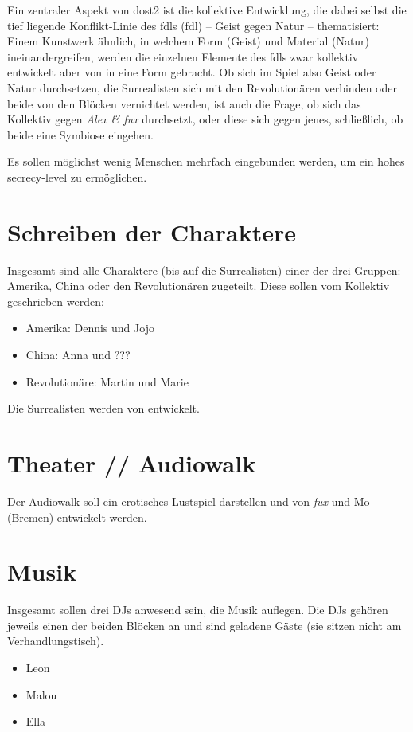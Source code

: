 Ein zentraler Aspekt von \ac{dost2} ist die kollektive Entwicklung, die dabei
selbst die tief liegende Konflikt-Linie des \aclp{fdl} (\acs{fdl}) 
-- Geist gegen Natur -- thematisiert: Einem Kunstwerk ähnlich, in welchem Form
(Geist) und Material (Natur) ineinandergreifen, werden die einzelnen Elemente
des \ac{fdl}s zwar kollektiv entwickelt aber von \creators{} in eine Form
gebracht. Ob sich im Spiel also Geist oder Natur durchsetzen, die Surrealisten
sich mit den Revolutionären verbinden oder beide von den Blöcken vernichtet
werden, ist auch die Frage, ob sich das Kollektiv gegen \emph{Alex \& fux}
durchsetzt, oder diese sich gegen jenes, schließlich, ob beide eine Symbiose
eingehen. 

Es sollen möglichst wenig Menschen mehrfach eingebunden werden, um ein hohes
secrecy-level zu ermöglichen.

\section{Schreiben der Charaktere}
Insgesamt sind alle Charaktere (bis auf die Surrealisten) einer der drei
Gruppen: Amerika, China oder den Revolutionären zugeteilt. Diese sollen vom
Kollektiv geschrieben werden: 
\begin{itemize} 
  \item Amerika: Dennis und Jojo 
  \item China: Anna und ???
  \item Revolutionäre: Martin und Marie 
\end{itemize}
Die Surrealisten werden von \creators{} entwickelt.

\section{Theater // Audiowalk}
Der Audiowalk soll ein erotisches Lustspiel darstellen und von \emph{fux} und
Mo (Bremen) entwickelt werden. 

\section{Musik}
Insgesamt sollen drei DJs anwesend sein, die Musik auflegen. Die DJs gehören
jeweils einen der beiden Blöcken an und sind geladene Gäste (sie sitzen nicht am
Verhandlungstisch).
\begin{itemize} 
  \item Leon 
  \item Malou 
  \item Ella
\end{itemize}


